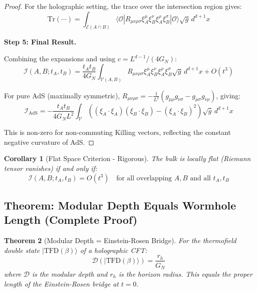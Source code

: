 \documentclass[12pt,a4paper]{article}
\newtheorem{theorem}{Theorem}[section]
\newtheorem{corollary}[theorem]{Corollary}
\begin{document}
\begin{proof}
For the holographic setting, the trace over the intersection region gives:
\begin{equation}
\text{Tr}(\cdots) = \int_{\mathcal{E}(A \cap B)} \langle \mathcal{O} | R_{\mu\nu\rho\sigma}\xi_A^\mu \xi_B^\nu \xi_A^\rho \xi_B^\sigma | \mathcal{O} \rangle \sqrt{g} \, d^{d+1}x
\end{equation}

\textbf{Step 5: Final Result.}

Combining the expansions and using $c = L^{d-1}/(4G_N)$:
\begin{equation}
\mathcal{I}(A, B; t_A, t_B) = \frac{t_A t_B}{4G_N} \int_{\mathcal{V}(A,B)} R_{\mu\nu\rho\sigma} \xi_A^\mu \xi_B^\nu \xi_A^\rho \xi_B^\sigma \sqrt{g} \, d^{d+1}x + O(t^3)
\end{equation}

For pure AdS (maximally symmetric), $R_{\mu\nu\rho\sigma} = -\frac{1}{L^2}(g_{\mu\rho}g_{\nu\sigma} - g_{\mu\sigma}g_{\nu\rho})$, giving:
\begin{equation}
\mathcal{I}_{\text{AdS}} = -\frac{t_A t_B}{4G_N L^2} \int_{\mathcal{V}} \left( (\xi_A \cdot \xi_A)(\xi_B \cdot \xi_B) - (\xi_A \cdot \xi_B)^2 \right) \sqrt{g} \, d^{d+1}x
\end{equation}

This is non-zero for non-commuting Killing vectors, reflecting the constant negative curvature of AdS.
\end{proof}

\begin{corollary}[Flat Space Criterion - Rigorous]
The bulk is locally flat (Riemann tensor vanishes) if and only if:
\begin{equation}
\mathcal{I}(A, B; t_A, t_B) = O(t^3) \quad \text{for all overlapping } A, B \text{ and all } t_A, t_B
\end{equation}
\end{corollary}

\subsection{Theorem: Modular Depth Equals Wormhole Length (Complete Proof)}

\begin{theorem}[Modular Depth = Einstein-Rosen Bridge]\label{thm:modular-depth}
For the thermofield double state $|\text{TFD}(\beta)\rangle$ of a holographic CFT:
\begin{equation}
\mathcal{D}(|\text{TFD}(\beta)\rangle) = \frac{r_h}{G_N}
\end{equation}
where $\mathcal{D}$ is the modular depth and $r_h$ is the horizon radius. This equals the proper length of the Einstein-Rosen bridge at $t=0$.
\end{theorem}
\end{document}
